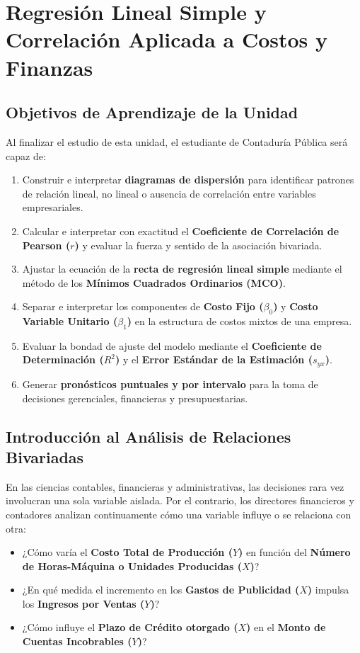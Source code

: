 \chapter{Regresión Lineal Simple y Correlación Aplicada a Costos y Finanzas}
\label{cap:regresion_correlacion}

\section*{Objetivos de Aprendizaje de la Unidad}
Al finalizar el estudio de esta unidad, el estudiante de Contaduría Pública será capaz de:
\begin{enumerate}
    \item Construir e interpretar \textbf{diagramas de dispersión} para identificar patrones de relación lineal, no lineal o ausencia de correlación entre variables empresariales.
    \item Calcular e interpretar con exactitud el \textbf{Coeficiente de Correlación de Pearson ($r$)} y evaluar la fuerza y sentido de la asociación bivariada.
    \item Ajustar la ecuación de la \textbf{recta de regresión lineal simple} mediante el método de los \textbf{Mínimos Cuadrados Ordinarios (MCO)}.
    \item Separar e interpretar los componentes de \textbf{Costo Fijo ($\beta_0$)} y \textbf{Costo Variable Unitario ($\beta_1$)} en la estructura de costos mixtos de una empresa.
    \item Evaluar la bondad de ajuste del modelo mediante el \textbf{Coeficiente de Determinación ($R^2$)} y el \textbf{Error Estándar de la Estimación ($s_{yx}$)}.
    \item Generar \textbf{pronósticos puntuales y por intervalo} para la toma de decisiones gerenciales, financieras y presupuestarias.
\end{enumerate}

\section{Introducción al Análisis de Relaciones Bivariadas}
En las ciencias contables, financieras y administrativas, las decisiones rara vez involucran una sola variable aislada. Por el contrario, los directores financieros y contadores analizan continuamente cómo una variable influye o se relaciona con otra:
\begin{itemize}
    \item ¿Cómo varía el \textbf{Costo Total de Producción ($Y$)} en función del \textbf{Número de Horas-Máquina o Unidades Producidas ($X$)}?
    \item ¿En qué medida el incremento en los \textbf{Gastos de Publicidad ($X$)} impulsa los \textbf{Ingresos por Ventas ($Y$)}?
    \item ¿Cómo influye el \textbf{Plazo de Crédito otorgado ($X$)} en el \textbf{Monto de Cuentas Incobrables ($Y$)}?
\end{itemize}

